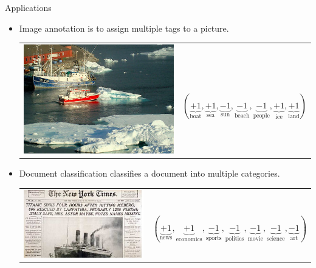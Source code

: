 \documentclass[first=purple,second=dgreen,logo=redexc]{aaltoslides}
\begin{document}
{\begin{frame}{Applications}
	\begin{itemize}
		\item Image annotation is to assign multiple tags to a picture.
		\begin{tabular}{p{3cm}p{10cm}}
        \multirow{2}{*}{\includegraphics[scale = 0.13]{./figures/boatsea.png}} & \\
		& $(\underbrace{+1}_{\text{boat}},\underbrace{+1}_{\text{sea}},\underbrace{-1}_{\text{sun}},\underbrace{-1}_{\text{beach}},\underbrace{-1}_{\text{people}},\underbrace{+1}_{\text{ice}},\underbrace{+1}_{\text{land}})$\\
        \end{tabular}
		\item Document classification classifies a document into multiple categories.
		\begin{tabular}{p{3cm}p{10cm}} 
        \multirow{2}{*}{\includegraphics[scale = 0.13]{./figures/titanic.jpg}} & \\
		& $(\underbrace{+1}_{\text{news}},\underbrace{+1}_{\text{economics}},\underbrace{-1}_{\text{sports}},\underbrace{-1}_{\text{politics}},\underbrace{-1}_{\text{movie}},\underbrace{-1}_{\text{science}},\underbrace{-1}_{\text{art}})$\\

\end{tabular}
\end{itemize}
\end{frame}}
\end{document}
